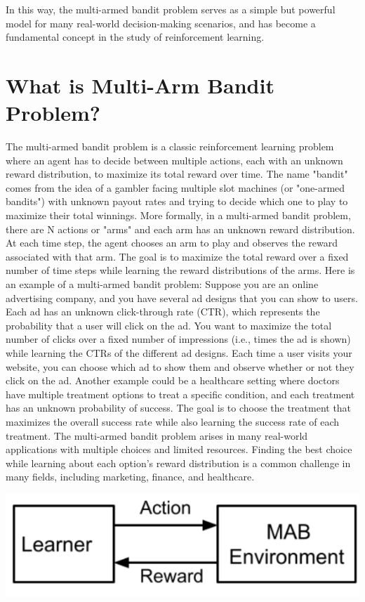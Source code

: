 \documentclass{article}
\begin{document}
In this way, the multi-armed bandit problem serves as a simple but powerful model for many real-world decision-making scenarios, and has become a fundamental concept in the study of reinforcement learning.

\section{What is Multi-Arm Bandit Problem?}
The multi-armed bandit problem is a classic reinforcement learning problem where an agent has to decide between multiple actions, each with an unknown reward distribution, to maximize its total reward over time. The name "bandit" comes from the idea of a gambler facing multiple slot machines (or "one-armed bandits") with unknown payout rates and trying to decide which one to play to maximize their total winnings.
More formally, in a multi-armed bandit problem, there are N actions or "arms" and each arm has an unknown reward distribution. At each time step, the agent chooses an arm to play and observes the reward associated with that arm. The goal is to maximize the total reward over a fixed number of time steps while learning the reward distributions of the arms.
Here is an example of a multi-armed bandit problem:
Suppose you are an online advertising company, and you have several ad designs that you can show to users. Each ad has an unknown click-through rate (CTR), which represents the probability that a user will click on the ad. You want to maximize the total number of clicks over a fixed number of impressions (i.e., times the ad is shown) while learning the CTRs of the different ad designs. Each time a user visits your website, you can choose which ad to show them and observe whether or not they click on the ad.
Another example could be a healthcare setting where doctors have multiple treatment options to treat a specific condition, and each treatment has an unknown probability of success. The goal is to choose the treatment that maximizes the overall success rate while also learning the success rate of each treatment.
The multi-armed bandit problem arises in many real-world applications with multiple choices and limited resources. Finding the best choice while learning about each option's reward distribution is a common challenge in many fields, including marketing, finance, and healthcare.

\begin{center}
    \includegraphics{MABcycle.png}
\end{center}
\end{document}
